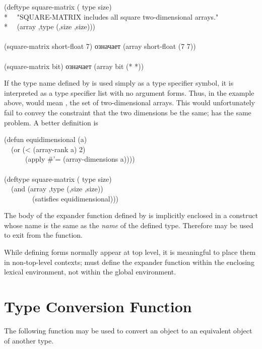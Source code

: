 \begin{defmac}
\begin{lisp}
(deftype square-matrix ( type size) \\*
~~"SQUARE-MATRIX includes all square two-dimensional arrays." \\*
~~{\Xbq}(array ,type (,size ,size))) \\
 \\
(square-matrix short-float 7)  \textrm{означает}  (array short-float (7 7)) \\
 \\
(square-matrix bit)  \textrm{означает}  (array bit (* *))
\end{lisp}
If the type name defined by  is used simply as a type
specifier symbol, it is interpreted as a type specifier list with
no argument forms.  Thus, in the example above, 
would mean , the set of two-dimensional arrays.
This would unfortunately fail to convey the constraint that the two
dimensions be the same;  has the same problem.
A better definition is
\begin{lisp}
(defun equidimensional (a) \\
~~(or (< (array-rank a) 2) \\
~~~~~~(apply \#'= (array-dimensions a)))) \\
 \\
(deftype square-matrix ( type size) \\
~~{\Xbq}(and (array ,type (,size ,size)) \\
~~~~~~~~(satisfies equidimensional)))
\end{lisp}

The body of the expander function defined
by  is implicitly enclosed in a  construct
whose name is the same as the \emph{name} of the defined type.
Therefore  may be used to exit from the function.

While defining forms normally appear at top level,
it is meaningful to place them in non-top-level contexts;
 must define the expander function
within the enclosing lexical environment, not within the global
environment.

\end{defmac}

\section{Type Conversion Function}

The following function may be used to convert an object to an
equivalent object of another type.

